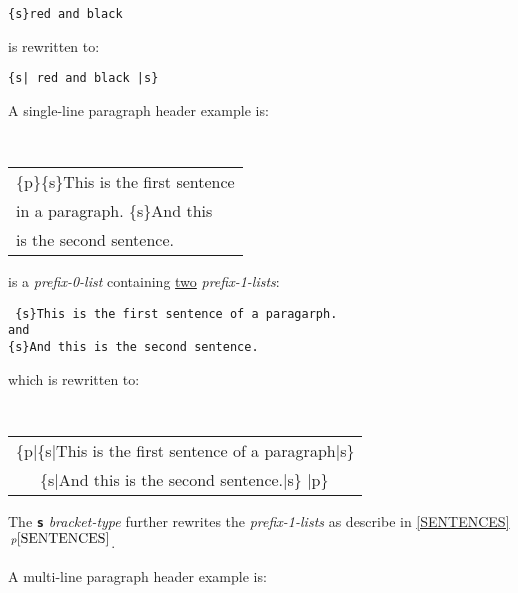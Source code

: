 \documentclass[12pt]{article}
\newcommand{\TT}[1]{{\tt \bfseries #1}}
\newcommand{\itemref}[1]{\ref{#1}$\,^{p\pageref{#1}}$}
\newenvironment{indpar}[1][0.3in]%
	{\begin{list}{}%
		     {\setlength{\itemsep}{0in}%
		      \setlength{\topsep}{0in}%
		      \setlength{\parsep}{1ex}%
		      \setlength{\labelwidth}{#1}%
		      \setlength{\leftmargin}{#1}%
		      \addtolength{\leftmargin}{\labelsep}}%
	 \item}%
	{\end{list}}
\begin{document}
\begin{indpar}
\begin{indpar}
\tt \{s\}red and black
\end{indpar}
is rewritten to:
\begin{indpar}
\tt \{s| red and black |s\} 
\end{indpar}
\end{indpar}

A single-line paragraph header example is:

\begin{indpar}
\tt
\begin{tabular}{l}
\{p\}\{s\}This is the first sentence \\
in a paragraph.  \{s\}And this \\
is the second sentence. \\
\end{tabular}
\end{indpar}
is a {\em prefix-0-list} containing \underline{two} {\em prefix-1-lists}:
\begin{indpar}
\tt
\{s\}This is the first sentence of a paragarph. \\
{\rm and} \\
\{s\}And this is the second sentence.
\end{indpar}
which is rewritten to:
\begin{indpar}
\tt
\begin{tabular}{l}
\{p|\{s|This is the first sentence of a paragraph|s\} \\
~~~\{s|And this is the second sentence.|s\} |p\}
\end{tabular}
\end{indpar}

The \TT{s} {\em bracket-type} further rewrites the {\em prefix-1-lists}
as describe in \itemref{SENTENCES}.


A multi-line paragraph header example is:
\end{document}
